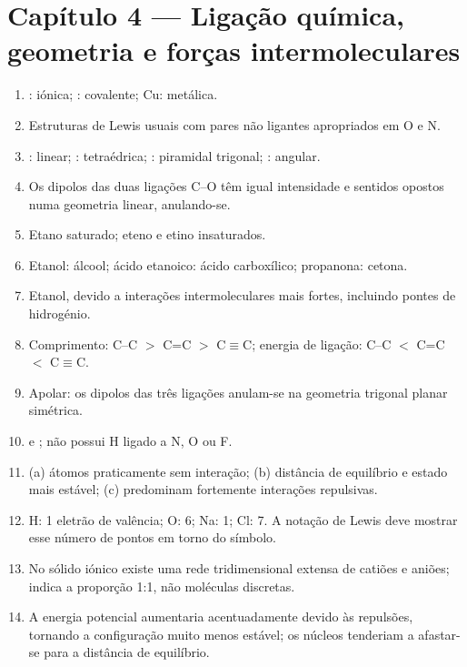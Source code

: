 \documentclass[11pt,a4paper,oneside]{book}
\begin{document}
\section*{Capítulo 4 — Ligação química, geometria e forças intermoleculares}
\begin{enumerate}
  \item {}: iónica; : covalente; Cu: metálica.
  \item Estruturas de Lewis usuais com pares não ligantes apropriados em O e N.
  \item {}: linear; : tetraédrica; : piramidal trigonal; : angular.
  \item Os dipolos das duas ligações C--O têm igual intensidade e sentidos opostos numa geometria linear, anulando-se.
  \item Etano saturado; eteno e etino insaturados.
  \item Etanol: álcool; ácido etanoico: ácido carboxílico; propanona: cetona.
  \item Etanol, devido a interações intermoleculares mais fortes, incluindo pontes de hidrogénio.
  \item Comprimento: C--C $>$ C=C $>$ C$\equiv$C; energia de ligação: C--C $<$ C=C $<$ C$\equiv$C.
  \item Apolar: os dipolos das três ligações anulam-se na geometria trigonal planar simétrica.
  \item {} e ;  não possui H ligado a N, O ou F.

  \item (a) átomos praticamente sem interação; (b) distância de equilíbrio e estado mais estável; (c) predominam fortemente interações repulsivas.
  \item H: 1 eletrão de valência; O: 6; Na: 1; Cl: 7. A notação de Lewis deve mostrar esse número de pontos em torno do símbolo.
  \item No sólido iónico existe uma rede tridimensional extensa de catiões e aniões;  indica a proporção 1:1, não moléculas discretas.
  \item A energia potencial aumentaria acentuadamente devido às repulsões, tornando a configuração muito menos estável; os núcleos tenderiam a afastar-se para a distância de equilíbrio.
\end{enumerate}
\end{document}
